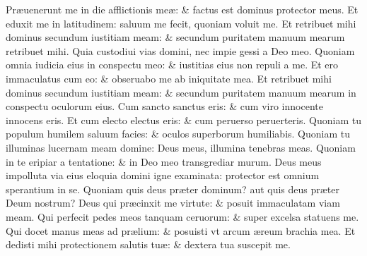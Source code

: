 \documentclass[a5paper,10pt]{book}
\def\ae{æ}
\begin{document}
\begin{multicols*}{2}
\newline \color{red} P\color{black}r\ae uenerunt me in die afflictionis me\ae : \& factus est dominus protector meus.
\newline \color{red} E\color{black}t eduxit me in latitudinem: saluum me fecit, quoniam voluit me.
\newline \color{red} E\color{black}t retribuet mihi dominus secundum iustitiam meam: \& secundum puritatem manuum mearum retribuet mihi.
\newline \color{red} Q\color{black}uia custodiui vias domini, nec impie gessi a Deo meo.
\newline \color{red} Q\color{black}uoniam omnia iudicia eius in conspectu meo: \& iustitias eius non repuli a me.
\newline \color{red} E\color{black}t ero immaculatus cum eo: \& obseruabo me ab iniquitate mea.
\newline \color{red} E\color{black}t retribuet mihi dominus secundum iustitiam meam: \& secundum puritatem manuum mearum in conspectu oculorum eius.
\newline \color{red} C\color{black}um sancto sanctus eris: \& cum viro innocente innocens eris.
\newline \color{red} E\color{black}t cum electo electus eris: \& cum peruerso peruerteris.
\newline \color{red} Q\color{black}uoniam tu populum humilem saluum facies: \& oculos superborum humiliabis.
\newline \color{red} Q\color{black}uoniam tu illuminas lucernam meam domine: Deus meus, illumina tenebras meas.
\newline \color{red} Q\color{black}uoniam in te eripiar a tentatione: \& in Deo meo transgrediar murum.
\newline \color{red} D\color{black}eus meus impolluta via eius eloquia domini igne examinata: protector est omnium sperantium in se.
\newline \color{red} Q\color{black}uoniam quis deus pr\ae ter dominum? aut quis deus pr\ae ter Deum nostrum?
\newline \color{red} D\color{black}eus qui pr\ae cinxit me virtute: \& posuit immaculatam viam meam.
\newline \color{red} Q\color{black}ui perfecit pedes meos tanquam ceruorum: \& super excelsa statuens me.
\newline \color{red} Q\color{black}ui docet manus meas ad pr\ae lium: \& posuisti vt arcum \ae reum brachia mea.
\newline \color{red} E\color{black}t dedisti mihi protectionem salutis tu\ae : \& dextera tua suscepit me.

\end{multicols*}
\end{document}
